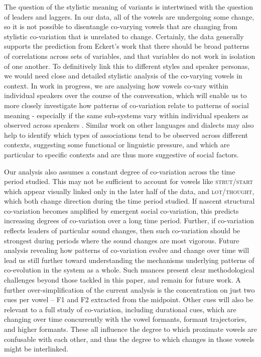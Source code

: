 \documentclass[review]{elsarticle} %
\begin{document}
The question of the stylistic meaning of variants is intertwined with the question of leaders and laggers. In our data, all of the vowels are undergoing some change, so it is not possible to disentangle co-varying vowels that are changing from stylistic co-variation that is unrelated to change.  Certainly, the data generally supports the prediction from Eckert's work that there should be broad patterns of correlations across sets of variables, and that variables do not work in isolation of one another.  To definitively link this to different styles and speaker personas, we would need close and detailed stylistic analysis of the co-varying vowels in context.   In work in progress, we are analysing how vowels co-vary within individual speakers over the course of the conversation, which will enable us to more closely investigate how patterns of co-variation relate to patterns of social meaning - especially if the same sub-systems vary within individual speakers as observed across speakers \citep{brandvowelspace}.   Similar work on other languages and dialects may also help to identify which types of associations   tend to be observed across different contexts, suggesting some functional or linguistic pressure, and which are particular to specific contexts and are thus more suggestive of social factors.


Our analysis also assumes a constant degree of co-variation across the time period studied.  This may not be sufficient to account for vowels like \textsc{strut/start} which appear visually linked only in the later half of the data, and \textsc{lot/thought}, which both change direction during the time period studied.  If nascent structural co-variation becomes amplified by emergent social co-variation, this predicts increasing degrees of co-variation over a long time period. Further, if co-variation reflects leaders of particular sound changes, then such co-variation should be strongest during periods where the sound changes are most vigorous. Future analysis revealing how patterns of co-variation evolve and change over time will lead us still further toward understanding the mechanisms underlying patterns of co-evolution in the system as a whole.  Such nuances present clear methodological challenges beyond those tackled in this paper, and remain for future work.   A further over-simplification of the current analysis is the concentration on just two cues per vowel -- F1 and F2 extracted from the midpoint.  Other cues will also be relevant to a full study of co-variation, including durational cues, which are changing over time concurrently with the vowel formants, formant trajectories, and higher formants. These all influence the degree to which proximate vowels are confusable with each other, and thus the degree to which changes in those vowels might be interlinked. 
\end{document}
